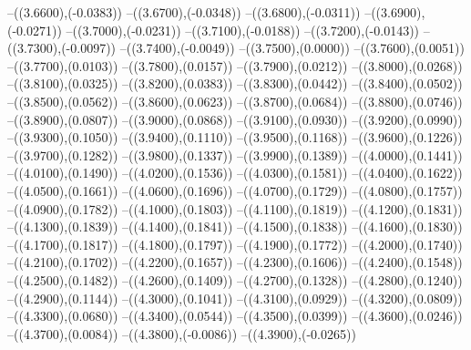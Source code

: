 {	--({\sx*(3.6600)},{\sy*(-0.0383)})
	--({\sx*(3.6700)},{\sy*(-0.0348)})
	--({\sx*(3.6800)},{\sy*(-0.0311)})
	--({\sx*(3.6900)},{\sy*(-0.0271)})
	--({\sx*(3.7000)},{\sy*(-0.0231)})
	--({\sx*(3.7100)},{\sy*(-0.0188)})
	--({\sx*(3.7200)},{\sy*(-0.0143)})
	--({\sx*(3.7300)},{\sy*(-0.0097)})
	--({\sx*(3.7400)},{\sy*(-0.0049)})
	--({\sx*(3.7500)},{\sy*(0.0000)})
	--({\sx*(3.7600)},{\sy*(0.0051)})
	--({\sx*(3.7700)},{\sy*(0.0103)})
	--({\sx*(3.7800)},{\sy*(0.0157)})
	--({\sx*(3.7900)},{\sy*(0.0212)})
	--({\sx*(3.8000)},{\sy*(0.0268)})
	--({\sx*(3.8100)},{\sy*(0.0325)})
	--({\sx*(3.8200)},{\sy*(0.0383)})
	--({\sx*(3.8300)},{\sy*(0.0442)})
	--({\sx*(3.8400)},{\sy*(0.0502)})
	--({\sx*(3.8500)},{\sy*(0.0562)})
	--({\sx*(3.8600)},{\sy*(0.0623)})
	--({\sx*(3.8700)},{\sy*(0.0684)})
	--({\sx*(3.8800)},{\sy*(0.0746)})
	--({\sx*(3.8900)},{\sy*(0.0807)})
	--({\sx*(3.9000)},{\sy*(0.0868)})
	--({\sx*(3.9100)},{\sy*(0.0930)})
	--({\sx*(3.9200)},{\sy*(0.0990)})
	--({\sx*(3.9300)},{\sy*(0.1050)})
	--({\sx*(3.9400)},{\sy*(0.1110)})
	--({\sx*(3.9500)},{\sy*(0.1168)})
	--({\sx*(3.9600)},{\sy*(0.1226)})
	--({\sx*(3.9700)},{\sy*(0.1282)})
	--({\sx*(3.9800)},{\sy*(0.1337)})
	--({\sx*(3.9900)},{\sy*(0.1389)})
	--({\sx*(4.0000)},{\sy*(0.1441)})
	--({\sx*(4.0100)},{\sy*(0.1490)})
	--({\sx*(4.0200)},{\sy*(0.1536)})
	--({\sx*(4.0300)},{\sy*(0.1581)})
	--({\sx*(4.0400)},{\sy*(0.1622)})
	--({\sx*(4.0500)},{\sy*(0.1661)})
	--({\sx*(4.0600)},{\sy*(0.1696)})
	--({\sx*(4.0700)},{\sy*(0.1729)})
	--({\sx*(4.0800)},{\sy*(0.1757)})
	--({\sx*(4.0900)},{\sy*(0.1782)})
	--({\sx*(4.1000)},{\sy*(0.1803)})
	--({\sx*(4.1100)},{\sy*(0.1819)})
	--({\sx*(4.1200)},{\sy*(0.1831)})
	--({\sx*(4.1300)},{\sy*(0.1839)})
	--({\sx*(4.1400)},{\sy*(0.1841)})
	--({\sx*(4.1500)},{\sy*(0.1838)})
	--({\sx*(4.1600)},{\sy*(0.1830)})
	--({\sx*(4.1700)},{\sy*(0.1817)})
	--({\sx*(4.1800)},{\sy*(0.1797)})
	--({\sx*(4.1900)},{\sy*(0.1772)})
	--({\sx*(4.2000)},{\sy*(0.1740)})
	--({\sx*(4.2100)},{\sy*(0.1702)})
	--({\sx*(4.2200)},{\sy*(0.1657)})
	--({\sx*(4.2300)},{\sy*(0.1606)})
	--({\sx*(4.2400)},{\sy*(0.1548)})
	--({\sx*(4.2500)},{\sy*(0.1482)})
	--({\sx*(4.2600)},{\sy*(0.1409)})
	--({\sx*(4.2700)},{\sy*(0.1328)})
	--({\sx*(4.2800)},{\sy*(0.1240)})
	--({\sx*(4.2900)},{\sy*(0.1144)})
	--({\sx*(4.3000)},{\sy*(0.1041)})
	--({\sx*(4.3100)},{\sy*(0.0929)})
	--({\sx*(4.3200)},{\sy*(0.0809)})
	--({\sx*(4.3300)},{\sy*(0.0680)})
	--({\sx*(4.3400)},{\sy*(0.0544)})
	--({\sx*(4.3500)},{\sy*(0.0399)})
	--({\sx*(4.3600)},{\sy*(0.0246)})
	--({\sx*(4.3700)},{\sy*(0.0084)})
	--({\sx*(4.3800)},{\sy*(-0.0086)})
	--({\sx*(4.3900)},{\sy*(-0.0265)})
}
